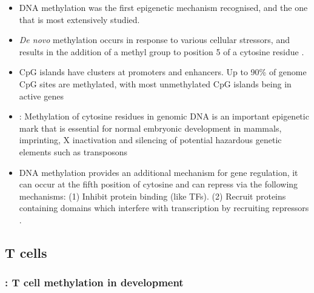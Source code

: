 \documentclass[12pt]{article}
\begin{document}
	\begin{itemize}
		\item DNA methylation was the first epigenetic mechanism recognised, and the one that is most extensively studied. \citep{Begin14}
		\item \textit{De novo} methylation occurs in response to various cellular stressors, and results in the addition of a methyl group to position 5 of a cytosine residue \citep{Begin14}.
		\item CpG islands have clusters at promoters and enhancers. Up to 90\% of genome CpG sites are methylated, with most unmethylated CpG islands being in active genes \citep{Begin14}
		\item \citet{Schmidl09}: Methylation of cytosine residues in genomic DNA is an important epigenetic mark that is essential for normal embryonic development in mammals, imprinting, X inactivation and silencing of potential hazardous genetic elements such as transposons
		\item DNA methylation provides an additional mechanism for gene regulation, it can occur at the fifth position of cytosine and can repress via the following mechanisms: (1) Inhibit protein binding (like TFs). (2) Recruit proteins containing domains which interfere with transcription by recruiting repressors \citep{Choukrallah14, Begin14}. 
	\end{itemize}
	
	\subsection{T cells}
	
	\subsubsection{\citeauthor{Begin14}\citeyear{Begin14}: T cell methylation in development}
	
\end{document}
